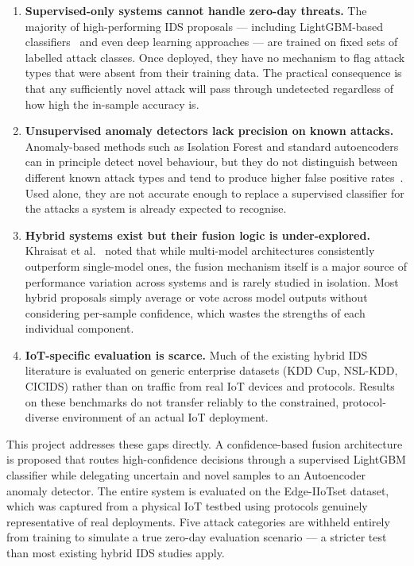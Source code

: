 \documentclass[12pt,a4paper]{report}
\begin{document}
\begin{enumerate}

  \item \textbf{Supervised-only systems cannot handle zero-day threats.}
        The majority of high-performing IDS proposals — including LightGBM-based
        classifiers~\cite{lgbm_ids} and even deep learning approaches — are
        trained on fixed sets of labelled attack classes. Once deployed, they
        have no mechanism to flag attack types that were absent from their
        training data. The practical consequence is that any sufficiently novel
        attack will pass through undetected regardless of how high the in-sample
        accuracy is.

  \item \textbf{Unsupervised anomaly detectors lack precision on known attacks.}
        Anomaly-based methods such as Isolation Forest and standard autoencoders
        can in principle detect novel behaviour, but they do not distinguish
        between different known attack types and tend to produce higher false
        positive rates~\cite{hybrid_survey}. Used alone, they are not accurate
        enough to replace a supervised classifier for the attacks a system is
        already expected to recognise.

  \item \textbf{Hybrid systems exist but their fusion logic is under-explored.}
        Khraisat et al.~\cite{hybrid_survey} noted that while multi-model
        architectures consistently outperform single-model ones, the fusion
        mechanism itself is a major source of performance variation across
        systems and is rarely studied in isolation. Most hybrid proposals
        simply average or vote across model outputs without considering
        per-sample confidence, which wastes the strengths of each individual
        component.

  \item \textbf{IoT-specific evaluation is scarce.}
        Much of the existing hybrid IDS literature is evaluated on generic
        enterprise datasets (KDD Cup, NSL-KDD, CICIDS) rather than on traffic
        from real IoT devices and protocols. Results on these benchmarks do not
        transfer reliably to the constrained, protocol-diverse environment of
        an actual IoT deployment.

\end{enumerate}

\noindent This project addresses these gaps directly. A confidence-based fusion
architecture is proposed that routes high-confidence decisions through a supervised
LightGBM classifier while delegating uncertain and novel samples to an Autoencoder
anomaly detector. The entire system is evaluated on the Edge-IIoTset dataset, which
was captured from a physical IoT testbed using protocols genuinely representative of
real deployments. Five attack categories are withheld entirely from training to
simulate a true zero-day evaluation scenario — a stricter test than most existing
hybrid IDS studies apply.
\end{document}
